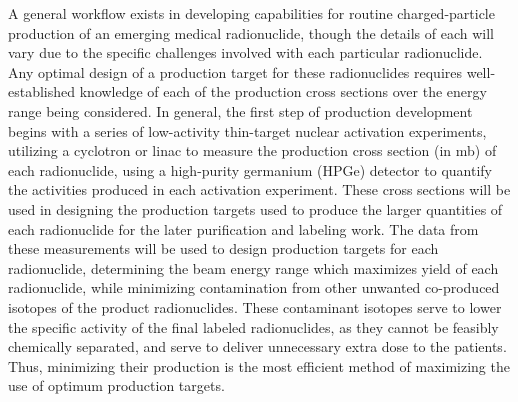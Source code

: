 





A general  workflow exists in developing capabilities for routine charged-particle production of an emerging medical radionuclide, though the details of each will vary due to the specific challenges involved with each particular radionuclide. 
Any optimal design of a production target for these radionuclides requires well-established knowledge of each of the production cross sections over the energy range being considered. 
In general, the first step of production development begins with a series of low-activity thin-target nuclear activation experiments, utilizing a cyclotron or linac to measure the production cross section (in mb) of each radionuclide, using a high-purity germanium (HPGe) detector to quantify the activities produced in each activation experiment. 
These cross sections will be used in designing the production targets used to produce the larger quantities of each radionuclide for the later purification and labeling work. 
The data from these measurements will be used to design  production targets for each radionuclide, determining the beam energy range which maximizes yield of each radionuclide, while minimizing contamination from other unwanted co-produced isotopes of the product radionuclides. 
These contaminant isotopes serve to lower the specific activity of the final labeled radionuclides, as they cannot be feasibly chemically separated, and serve to deliver unnecessary extra dose to the patients. 
Thus, minimizing their production is the most efficient method of maximizing the use of optimum production targets.

